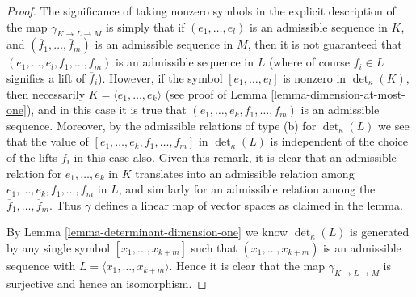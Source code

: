 \documentclass[10pt,a4paper]{amsart}
\theoremstyle{plain}
\theoremstyle{definition}
\theoremstyle{remark}
\numberwithin{equation}{subsection}
\begin{document}
\begin{proof}
The significance of taking nonzero symbols in the explicit description
of the map $\gamma_{K \to L \to M}$ is simply that if $(e_1, \ldots, e_l)$
is an admissible sequence in $K$, and
$(\overline{f}_1, \ldots, \overline{f}_m)$ is an admissible sequence in
$M$, then it is not guaranteed that $(e_1, \ldots, e_l, f_1, \ldots, f_m)$
is an admissible sequence in $L$ (where of course $f_i \in L$ signifies
a lift of $\overline{f}_i$). However, if the symbol
$[e_1, \ldots, e_l]$ is nonzero in $\det_\kappa(K)$, then
necessarily $K = \langle e_1, \ldots, e_k\rangle$ (see
proof of Lemma \ref{lemma-dimension-at-most-one}), and
in this case it is true that $(e_1, \ldots, e_k, f_1, \ldots, f_m)$
is an admissible sequence.
Moreover, by the admissible relations of type (b) for $\det_\kappa(L)$
we see that the value of $[e_1, \ldots, e_k, f_1, \ldots, f_m]$ in
$\det_\kappa(L)$ is independent of the choice of the lifts
$f_i$ in this case also. Given this remark, it is clear
that an admissible relation for $e_1, \ldots, e_k$ in $K$
translates into an admissible relation among
$e_1, \ldots, e_k, f_1, \ldots, f_m$ in $L$, and
similarly for an admissible relation among the
$\overline{f}_1, \ldots, \overline{f}_m$.
Thus $\gamma$ defines a linear map of vector spaces as claimed in the lemma.

\medskip\noindent
By Lemma \ref{lemma-determinant-dimension-one} we know
$\det_\kappa(L)$ is generated by any single
symbol $[x_1, \ldots, x_{k + m}]$ such that
$(x_1, \ldots, x_{k + m})$ is an admissible sequence
with $L = \langle x_1, \ldots, x_{k + m}\rangle$. Hence it is
clear that the map $\gamma_{K \to L \to M}$ is surjective and
hence an isomorphism.


\end{proof}
\end{document}
